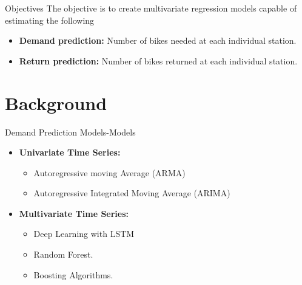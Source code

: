 \documentclass[
  ignorenonframetext,
]{beamer}
\providecommand{\tightlist}{%
  \setlength{\itemsep}{0pt}\setlength{\parskip}{0pt}}
\begin{document}
\begin{frame}{Objectives}
\protect\hypertarget{objectives}{}
The objective is to create multivariate regression models capable of
estimating the following

\begin{itemize}
\tightlist
\item
  \textbf{Demand prediction:} Number of bikes needed at each individual
  station.
\item
  \textbf{Return prediction:} Number of bikes returned at each
  individual station.
\end{itemize}
\end{frame}

\hypertarget{background}{%
\section{Background}\label{background}}

\begin{frame}{Demand Prediction Models-Models}
\protect\hypertarget{demand-prediction-models-models}{}
\begin{itemize}
\tightlist
\item
  \textbf{Univariate Time Series: }

  \begin{itemize}
  \tightlist
  \item
    Autoregressive moving Average (ARMA)
  \item
    Autoregressive Integrated Moving Average (ARIMA)
  \end{itemize}
\item
  \textbf{Multivariate Time Series: }

  \begin{itemize}
  \tightlist
  \item
    Deep Learning with LSTM
  \item
    Random Forest.
  \item
    Boosting Algorithms.
  \end{itemize}
\end{itemize}
\end{frame}
\end{document}
